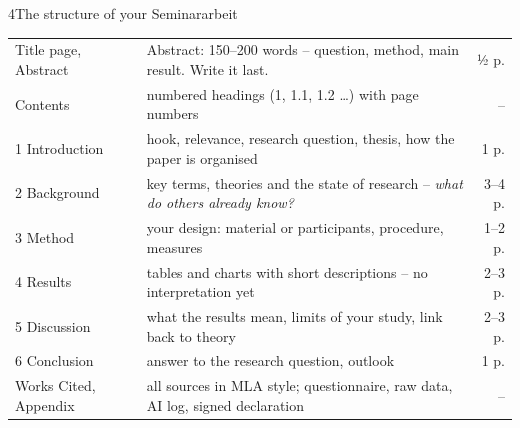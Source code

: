 \begin{wsbox}{4}{The structure of your Seminararbeit}
\renewcommand{\arraystretch}{1.18}
\small
\begin{tabularx}{\linewidth}{@{}>{\headfont\color{prim}}l X >{\color{muted}}r@{}}
\arrayrulecolor{rule}
Title page, Abstract & Abstract: 150–200 words – question, method, main result. Write it last. & ½ p.\\
Contents & numbered headings (1, 1.1, 1.2 …) with page numbers & –\\\midrule
1 Introduction & hook, relevance, research question, thesis, how the paper is organised & 1 p.\\
2 Background & key terms, theories and the state of research – \emph{what do others already know?} & 3–4 p.\\
3 Method & your design: material or participants, procedure, measures & 1–2 p.\\
4 Results & tables and charts with short descriptions – no interpretation yet & 2–3 p.\\
5 Discussion & what the results mean, limits of your study, link back to theory & 2–3 p.\\
6 Conclusion & answer to the research question, outlook & 1 p.\\\midrule
Works Cited, Appendix & all sources in MLA style; questionnaire, raw data, AI log, signed declaration & –\\
\end{tabularx}
\end{wsbox}

